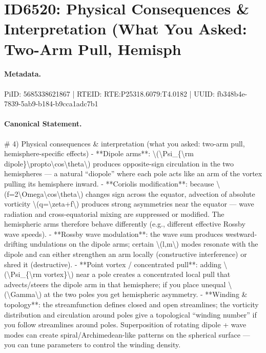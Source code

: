 \section*{ID6520: Physical Consequences \& Interpretation (What You Asked: Two-Arm Pull, Hemisph}
\paragraph{Metadata.}
PiID: 5685338621867 | RTEID: RTE:P25318.6079:T4.0182 | UUID: fb348b4e-7839-5ab9-b184-b9cca1adc7b1

\paragraph{Canonical Statement.}
\# 4) Physical consequences \& interpretation (what you asked: two-arm pull, hemisphere-specific effects) - **Dipole arms**: \textbackslash{}(\textbackslash{}Psi\_\{\textbackslash{}rm dipole\}\textbackslash{}propto\textbackslash{}cos\textbackslash{}theta\textbackslash{}) produces opposite-sign circulation in the two hemispheres — a natural “diopole” where each pole acts like an arm of the vortex pulling its hemisphere inward. - **Coriolis modification**: because \textbackslash{}(f=2\textbackslash{}Omega\textbackslash{}cos\textbackslash{}theta\textbackslash{}) changes sign across the equator, advection of absolute vorticity \textbackslash{}(q=\textbackslash{}zeta+f\textbackslash{}) produces strong asymmetries near the equator — wave radiation and cross-equatorial mixing are suppressed or modified. The hemispheric arms therefore behave differently (e.g., different effective Rossby wave speeds). - **Rossby wave modulation**: the wave sum produces westward-drifting undulations on the dipole arms; certain \textbackslash{}(l,m\textbackslash{}) modes resonate with the dipole and can either strengthen an arm locally (constructive interference) or shred it (destructive). - **Point vortex / concentrated pull**: adding \textbackslash{}(\textbackslash{}Psi\_\{\textbackslash{}rm vortex\}\textbackslash{}) near a pole creates a concentrated local pull that advects/steers the dipole arm in that hemisphere; if you place unequal \textbackslash{}(\textbackslash{}Gamma\textbackslash{}) at the two poles you get hemispheric asymmetry. - **Winding \& topology**: the streamfunction defines closed and open streamlines; the vorticity distribution and circulation around poles give a topological “winding number” if you follow streamlines around poles. Superposition of rotating dipole + wave modes can create spiral/Archimedean-like patterns on the spherical surface — you can tune parameters to control the winding density.

